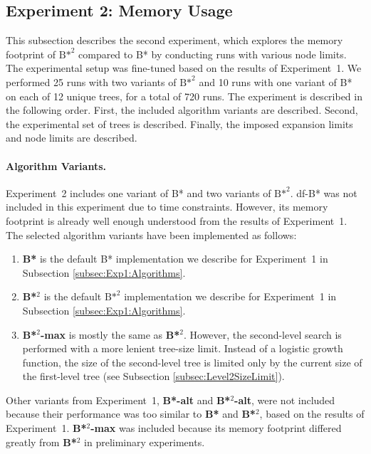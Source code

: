 \FloatBarrier
\subsection{Experiment 2: Memory Usage}
\label{subsec:Exp2}
This subsection describes the second experiment, which explores the memory footprint of ${\text{B*}}^2$ compared to B* by conducting runs with various node limits.
The experimental setup was fine-tuned based on the results of Experiment\ 1.
We performed 25 runs with two variants of ${\text{B*}}^2$ and 10 runs with one variant of B* on each of 12 unique trees, for a total of 720 runs. The experiment is described in the following order. First, the included algorithm variants are described. Second, the experimental set of trees is described. Finally, the imposed expansion limits and node limits are described.

\paragraph{Algorithm Variants.}
\label{subsec:Exp2:Algorithms}
Experiment\ 2 includes one variant of B* and two variants of ${\text{B*}}^2$. df-B* was not included in this experiment due to time constraints. However, its memory footprint is already well enough understood from the results of Experiment\ 1. The selected algorithm variants have been implemented as follows:
\begin{enumerate}
    \item \textbf{B*} is the default B* implementation we describe for Experiment\ 1 in Subsection \ref{subsec:Exp1:Algorithms}.
    \item \textbf{B*}$^2$ is the default ${\text{B*}}^2$ implementation we describe for Experiment\ 1 in Subsection \ref{subsec:Exp1:Algorithms}.
    \item \textbf{B*}$^2$\textbf{-max} is mostly the same as \textbf{B*}$^2$. However, the second-level search is performed with a more lenient tree-size limit. Instead of a logistic growth function, the size of the second-level tree is limited only by the current size of the first-level tree (see Subsection \ref{subsec:Level2SizeLimit}).
\end{enumerate}
Other variants from Experiment\ 1, \textbf{B*-alt} and \textbf{B*}$^2$\textbf{-alt}, were not included because their performance was too similar to \textbf{B*} and \textbf{B*}$^2$, based on the results of Experiment\ 1. \textbf{B*}$^2$\textbf{-max} was included because its memory footprint differed greatly from \textbf{B*}$^2$ in preliminary experiments.

